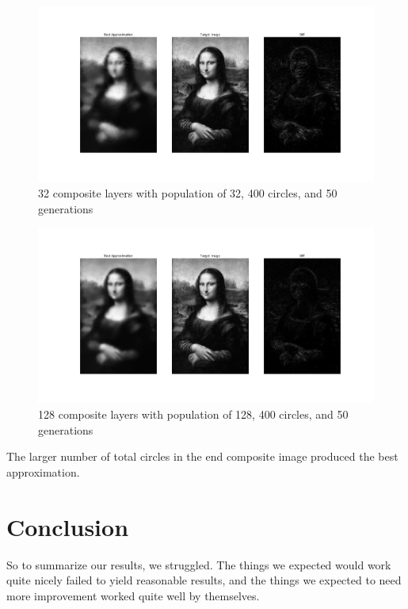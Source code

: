 \documentclass{article}
\begin{document}
\begin{figure}[H]
    \centering
    \includegraphics[width=\textwidth]{output/average32_c400p32g50.png}
    \caption{32 composite layers with population of 32, 400 circles, and 50
        generations}\label{fig:composite-32}
\end{figure}

\begin{figure}[H]
    \centering
    \includegraphics[width=\textwidth]{output/average128_c400p128g50l128.png}
    \caption{128 composite layers with population of 128, 400 circles, and 50
        generations}\label{fig:composite-128}
\end{figure}

The larger number of total circles in the end composite image produced the best approximation.

\section{Conclusion}
So to summarize our results, we struggled. The things we expected would work quite nicely failed to
yield reasonable results, and the things we expected to need more improvement worked quite well by
themselves.
\end{document}

